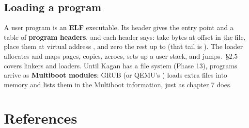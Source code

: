 \documentclass[11pt,a4paper]{article}
\begin{document}
\subsection{Loading a program}

A user program is an \textbf{ELF} executable. Its header gives the entry point and a table of \textbf{program
headers}, and each  header says: take  bytes at offset  in the file, place
them at virtual address , and zero the rest up to  (that tail is ). The loader
allocates and maps pages, copies, zeroes, sets up a user stack, and jumps. \OSC\,\S2.5 covers linkers and loaders.
Until Kagan has a file system (Phase 13), programs arrive as \textbf{Multiboot modules}: GRUB (or QEMU's
) loads extra files into memory and lists them in the Multiboot information, just as \LOB chapter 7 does.

\section{References}
\end{document}
